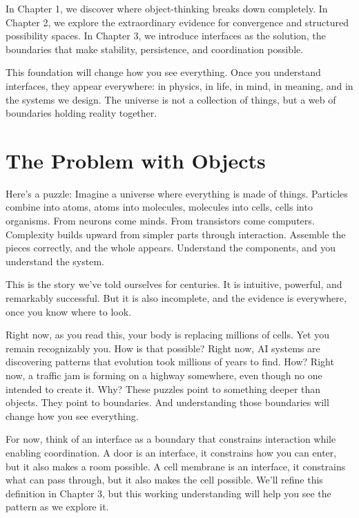 \documentclass[
  openright]{book}
\begin{document}
In Chapter 1, we discover where object-thinking breaks down completely.
In Chapter 2, we explore the extraordinary evidence for convergence and
structured possibility spaces. In Chapter 3, we introduce interfaces as
the solution, the boundaries that make stability, persistence, and
coordination possible.

This foundation will change how you see everything. Once you understand
interfaces, they appear everywhere: in physics, in life, in mind, in
meaning, and in the systems we design. The universe is not a collection
of things, but a web of boundaries holding reality together.

\chapter{The Problem with Objects}\label{the-problem-with-objects}

Here's a puzzle: Imagine a universe where everything is made of things.
Particles combine into atoms, atoms into molecules, molecules into
cells, cells into organisms. From neurons come minds. From transistors
come computers. Complexity builds upward from simpler parts through
interaction. Assemble the pieces correctly, and the whole appears.
Understand the components, and you understand the system.

This is the story we've told ourselves for centuries. It is intuitive,
powerful, and remarkably successful. But it is also incomplete, and the
evidence is everywhere, once you know where to look.

Right now, as you read this, your body is replacing millions of cells.
Yet you remain recognizably you. How is that possible? Right now, AI
systems are discovering patterns that
evolution took millions of years to find. How? Right
now, a traffic jam is forming on a highway somewhere,
even though no one intended to create it. Why? These puzzles point to
something deeper than objects. They point to boundaries. And
understanding those boundaries will change how you see everything.

For now, think of an interface as a boundary that constrains interaction
while enabling coordination. A door is an interface, it constrains how
you can enter, but it also makes a room possible. A cell membrane is an
interface, it constrains what can pass through, but it also makes the
cell possible. We'll refine this definition in Chapter 3, but this
working understanding will help you see the pattern as we explore it.
\end{document}
